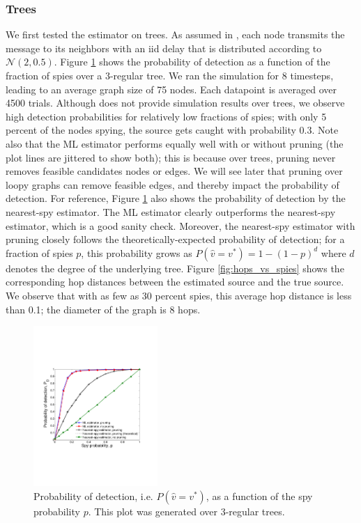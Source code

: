 \subsubsection{Trees}
We first tested the estimator on trees. As assumed in \cite{pinto}, each node transmits the message to its neighbors with an iid delay that is distributed according to $\mathcal N(2,0.5)$. Figure \ref{fig:pd_vs_spies} shows the probability of detection as a function of the fraction of spies over a 3-regular tree. We ran the simulation for 8 timesteps, leading to an average graph size of 75 nodes. Each datapoint is averaged over 4500 trials. Although \cite{pinto} does not provide simulation results over trees, we observe high detection probabilities for relatively low fractions of spies; with only 5 percent of the nodes spying, the source gets caught with probability 0.3. Note also that the ML estimator performs equally well with or without pruning (the plot lines are jittered to show both); this is because over trees, pruning never removes feasible candidates nodes or edges. We will see later that pruning over loopy graphs can remove feasible edges, and thereby impact the probability of detection. 
For reference, Figure \ref{fig:pd_vs_spies} also shows the probability of detection by the nearest-spy estimator. The ML estimator clearly outperforms the nearest-spy estimator, which is a good sanity check. Moreover, the nearest-spy estimator with pruning closely follows the theoretically-expected probability of detection; for a fraction of spies $p$, this probability grows as $P(\hat v=v^*)=1-(1-p)^d$ where $d$ denotes the degree of the underlying tree.
Figure \ref{fig:hops_vs_spies} shows the corresponding hop distances between the estimated source and the true source. We observe that with as few as 30 percent spies, this average hop distance is less than 0.1; the diameter of the graph is 8 hops. 
\begin{figure}
\centering
\includegraphics[height = 2.4in]{figures/pd_vs_spies}
\caption{Probability of detection, i.e. $P(\hat v = v^*)$, as a function of the spy probability $p$. This plot was generated over 3-regular trees. %
}
\label{fig:pd_vs_spies}
\end{figure}

